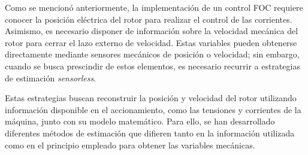 %
%
%
%
%
%
%
%
%

Como se mencionó anteriormente, la implementación de un control FOC requiere conocer la posición eléctrica del rotor para realizar el control de las corrientes. Asimismo, es necesario disponer de información sobre la velocidad mecánica del rotor para cerrar el lazo externo de velocidad. Estas variables pueden obtenerse directamente mediante sensores mecánicos de posición o velocidad; sin embargo, cuando se busca prescindir de estos elementos, es necesario recurrir a estrategias de estimación \textit{sensorless}.

Estas estrategias buscan reconstruir la posición y velocidad del rotor utilizando información disponible en el accionamiento, como las tensiones y corrientes de la máquina, junto con su modelo matemático. Para ello, se han desarrollado diferentes métodos de estimación que difieren tanto en la información utilizada como en el principio empleado para obtener las variables mecánicas.

%
%
%
%
%
%


